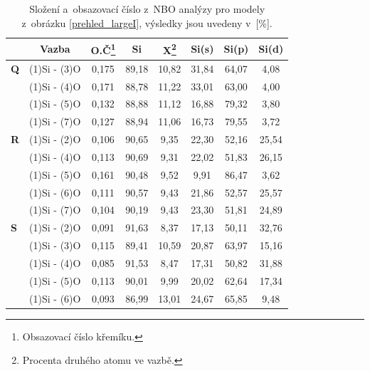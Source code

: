 \documentclass[
digital, %
table,   %
lof,     %
lot,     %
oneside,
]{fithesis3}
\begin{document}
\begin{table}[H]
\caption{Složení a~obsazovací číslo z~NBO analýzy pro modely z~obrázku \ref{prehled_largeI}, výsledky jsou uvedeny v~[\%].}
\begin{minipage}{\textwidth}
\begin{center}
\begin{tabular}{|l|c|c|c|c|c|c|c|}
\hline
\label{nbo_largeI}&  Vazba & O.Č\footnote{Obsazovací číslo křemíku.} & Si & X\footnote{Procenta druhého atomu ve  vazbě.} & Si(s) & Si(p) &Si(d) \\ \hline
\textbf{Q}&  (1)Si - (3)O   & 0,175 & 89,18   & 10,82   & 31,84   & 64,07   & 4,08   \\ \hline
&  (1)Si - (4)O  & 0,171 & 88,78   & 11,22   & 33,01   & 63,00   & 4,00   \\ \hline
& (1)Si - (5)O & 0,132 & 88,88   & 11,12   & 16,88   & 79,32   & 3,80   \\ \hline
& (1)Si - (7)O & 0,127 & 88,94   & 11,06   & 16,73   & 79,55   & 3,72   \\ \hline
\textbf{R} & (1)Si - (2)O  & 0,106 & 90,65   & 9,35   & 22,30   & 52,16   & 25,54   \\ \hline
& (1)Si - (4)O & 0,113 & 90,69   & 9,31   & 22,02   & 51,83   & 26,15   \\ \hline
&  (1)Si - (5)O  & 0,161 & 90,48   & 9,52   & 9,91   & 86,47   & 3,62   \\ \hline
&  (1)Si - (6)O & 0,111 & 90,57   & 9,43   & 21,86   & 52,57   & 25,57   \\ \hline
& (1)Si - (7)O & 0,104 & 90,19   & 9,43   & 23,30   & 51,81   & 24,89   \\ \hline
\textbf{S}&(1)Si - (2)O  & 0,091 & 91,63   & 8,37   & 17,13   & 50,11   & 32,76   \\ \hline
& (1)Si - (3)O  & 0,115 & 89,41   & 10,59   & 20,87   & 63,97   & 15,16   \\ \hline
&   (1)Si - (4)O   & 0,085 & 91,53   & 8,47   & 17,31   & 50,82   & 31,88   \\ \hline
&  (1)Si - (5)O  & 0,113 & 90,01   & 9,99   & 20,02   & 62,64   & 17,34   \\ \hline
& (1)Si - (6)O & 0,093 & 86,99   & 13,01   & 24,67   & 65,85   & 9,48   \\ \hline
\end{tabular}\end{center}\end{minipage}\end{table}
\end{document}
